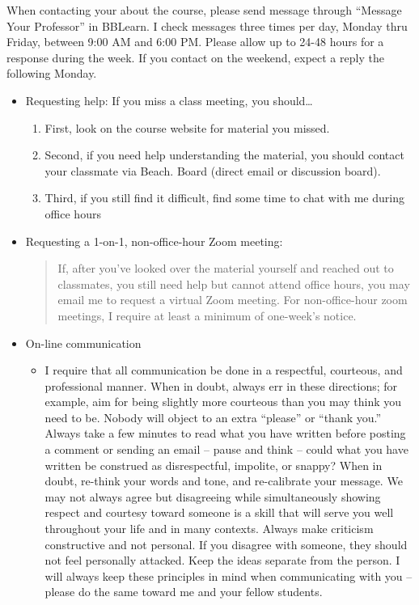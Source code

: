 \documentclass[11pt,]{article}
\providecommand{\tightlist}{%
  \setlength{\itemsep}{0pt}\setlength{\parskip}{0pt}}
\begin{document}
When contacting your about the course, please send message through
``Message Your Professor'' in BBLearn. I check messages three times per
day, Monday thru Friday, between 9:00 AM and 6:00 PM. Please allow up to
24-48 hours for a response during the week. If you contact on the
weekend, expect a reply the following Monday.

\begin{itemize}
\item
  Requesting help: If you miss a class meeting, you should\ldots{}

  \begin{enumerate}
  \def\labelenumi{\arabic{enumi}.}
  \tightlist
  \item
    First, look on the course website for material you missed.
  \item
    Second, if you need help understanding the material, you should
    contact your classmate via Beach. Board (direct email or discussion
    board).
  \item
    Third, if you still find it difficult, find some time to chat with
    me during office hours
  \end{enumerate}
\item
  Requesting a 1-on-1, non-office-hour Zoom meeting:

  \begin{quote}
  If, after you've looked over the material yourself and reached out to
  classmates, you still need help but cannot attend office hours, you
  may email me to request a virtual Zoom meeting. For non-office-hour
  zoom meetings, I require at least a minimum of one-week's notice.
  \end{quote}
\item
  On-line communication

  \begin{itemize}
  \tightlist
  \item
    I require that all communication be done in a respectful, courteous,
    and professional manner. When in doubt, always err in these
    directions; for example, aim for being slightly more courteous than
    you may think you need to be. Nobody will object to an extra
    ``please'' or ``thank you.'' Always take a few minutes to read what
    you have written before posting a comment or sending an email --
    pause and think -- could what you have written be construed as
    disrespectful, impolite, or snappy? When in doubt, re-think your
    words and tone, and re-calibrate your message. We may not always
    agree but disagreeing while simultaneously showing respect and
    courtesy toward someone is a skill that will serve you well
    throughout your life and in many contexts. Always make criticism
    constructive and not personal. If you disagree with someone, they
    should not feel personally attacked. Keep the ideas separate from
    the person. I will always keep these principles in mind when
    communicating with you -- please do the same toward me and your
    fellow students.
  \end{itemize}
\end{itemize}
\end{document}
